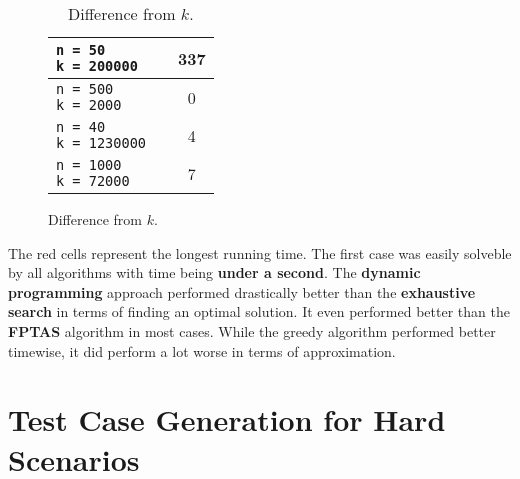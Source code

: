 \documentclass[11pt]{article}
\begin{document}
\begin{figure}[!hbpt]
\begin{minipage}{0.35\textwidth}
\begin{table}[H]
\begin{tabular}{|l|c|c|}
                \makecell[l]{ \texttt{n = 50} \\ \texttt{k = 200000}} &  \cellcolor{red!20}{19516} & 337 \\ \hline
                \makecell[l]{ \texttt{n = 500} \\ \texttt{k = 2000}} &  \cellcolor{red!20}{34} & 0 \\ \hline
                \makecell[l]{ \texttt{n = 40} \\ \texttt{k = 1230000}} &  \cellcolor{red!20}{33687} & 4 \\ \hline
                \makecell[l]{ \texttt{n = 1000} \\ \texttt{k = 72000}} & \cellcolor{red!20}{897} & 7 \\ \hline
            \end{tabular}
            \caption{Difference from $k$.}
        \end{table} 
    \end{minipage}  
\end{figure}

The red cells represent the longest running time. The first case was easily solveble by all algorithms with time being \textbf{under a second}. The \textbf{dynamic programming} approach performed drastically better than the \textbf{exhaustive search} in terms of finding an optimal solution. It even performed better than the \textbf{FPTAS} algorithm in most cases. While the greedy algorithm performed better timewise, it did perform a lot worse in terms of approximation.

\section{Test Case Generation for Hard Scenarios}
\end{document}
